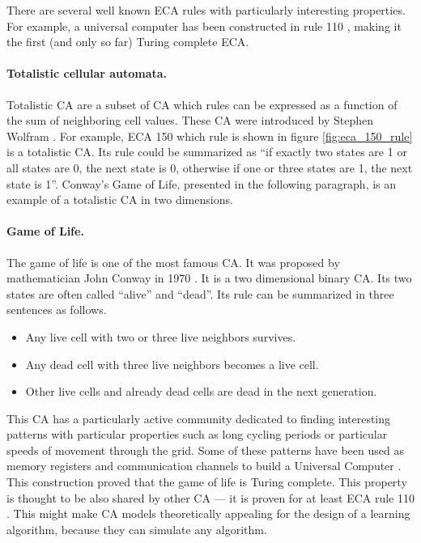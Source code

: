 There are several well known \ac{ECA} rules with particularly interesting
properties. For example, a universal computer has been constructed in rule 110
\parencite{cookUniversalityElementaryCellular2004}, making it the first (and
only so far) Turing complete \ac{ECA}.

\paragraph{Totalistic cellular automata.}
Totalistic \ac{CA} are a subset of \ac{CA} which rules can be expressed as a
function of the sum of neighboring cell values. These \ac{CA} were introduced by
Stephen Wolfram \parencite{wolframStatisticalMechanicsCellular1983}. For
example, \ac{ECA} 150 which rule is shown in figure \ref{fig:eca_150_rule} is a
totalistic \ac{CA}. Its rule could be summarized as ``if exactly two states are
1 or all states are 0, the next state is 0, otherwise if one or three states are
1, the next state is 1''. Conway's Game of Life, presented in the following paragraph, is an example
of a totalistic \ac{CA} in two dimensions.

\paragraph{Game of Life.\label{sec:game-life}}
The game of life is one of the most famous \ac{CA}. It was proposed by
mathematician John Conway in 1970 \parencite{gardnerMathematicalGames1970}. It
is a two dimensional binary \ac{CA}. Its two states are often called ``alive''
and ``dead''. Its rule can be summarized in three sentences as follows.
\begin{itemize}
  \item Any live cell with two or three live neighbors survives.
  \item Any dead cell with three live neighbors becomes a live cell.
  \item Other live cells and already dead cells are dead in the next generation.
\end{itemize}
This \ac{CA} has a particularly active community dedicated to finding
interesting patterns with particular properties such as long cycling periods or
particular speeds of movement through the grid. Some of these patterns have been
used as memory registers and communication channels to build a Universal
Computer \parencite{IgblanLifeUniversal}. This construction proved that the game
of life is Turing complete. This property is thought to be also shared by other
\ac{CA} --- it is proven for at least \ac{ECA} rule 110
\parencite{cookUniversalityElementaryCellular2004}. This might make \ac{CA}
models theoretically appealing for the design of a learning algorithm, because
they can simulate any algorithm.

